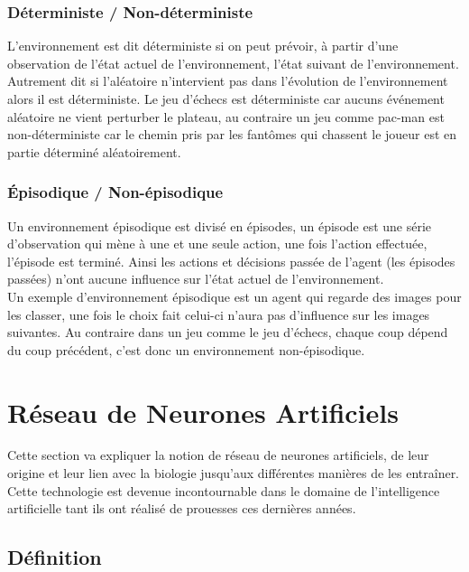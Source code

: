 \documentclass{article}
\begin{document}
\subsubsection{Déterministe / Non-déterministe}

L'environnement est dit déterministe si on peut prévoir, à partir d'une observation de l'état actuel de l'environnement, l'état suivant de l'environnement. Autrement dit si l'aléatoire n'intervient pas dans l'évolution de l'environnement alors il est déterministe\cite{tutoptai}. Le jeu d'échecs est déterministe car aucuns événement aléatoire ne vient perturber le plateau, au contraire un jeu comme pac-man est non-déterministe car le chemin pris par les fantômes qui chassent le joueur est en partie déterminé aléatoirement.

\subsubsection{Épisodique / Non-épisodique}

Un environnement épisodique est divisé en épisodes, un épisode est une série d'observation qui mène à une et une seule action, une fois l'action effectuée, l'épisode est terminé. Ainsi les actions et décisions passée de l'agent (les épisodes passées) n'ont aucune influence sur l'état actuel de l'environnement.\\
Un exemple d'environnement épisodique est un agent qui regarde des images pour les classer, une fois le choix fait celui-ci n'aura pas d'influence sur les images suivantes. Au contraire dans un jeu comme le jeu d'échecs, chaque coup dépend du coup précédent, c'est donc un environnement non-épisodique\cite{tutoptai}.

\newpage
\section{Réseau de Neurones Artificiels}

Cette section va expliquer la notion de réseau de neurones artificiels, de leur origine et leur lien avec la biologie jusqu'aux différentes manières de les entraîner. Cette technologie est devenue incontournable dans le domaine de l'intelligence artificielle tant ils ont réalisé de prouesses ces dernières années.

\subsection{Définition}
\end{document}
